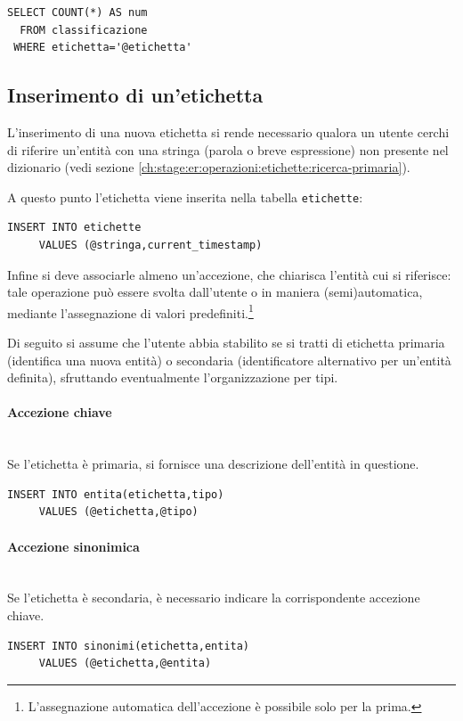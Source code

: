 \documentclass[10pt,a4paper,headinclude,footinclude,hidelinks]{scrreprt} %
\begin{document}
\begin{verbatim}
SELECT COUNT(*) AS num
  FROM classificazione
 WHERE etichetta='@etichetta'
\end{verbatim}

	\subsection{Inserimento di un'etichetta}
	\label{ch:stage:er:operazioni:etichette:inserimento}
	L'inserimento di una nuova etichetta si rende necessario qualora un utente cerchi di riferire un'entità con una stringa (parola o breve espressione) non presente nel dizionario (vedi sezione \ref{ch:stage:er:operazioni:etichette:ricerca-primaria}).

	A questo punto l'etichetta viene inserita nella tabella \texttt{etichette}:
\begin{verbatim}
INSERT INTO etichette
     VALUES (@stringa,current_timestamp)
\end{verbatim}

	Infine si deve associarle almeno un'accezione, che chiarisca l'entità cui si riferisce: tale operazione può essere svolta dall'utente o in maniera (semi)automatica, mediante l'assegnazione di valori predefiniti.\footnote{L'assegnazione automatica dell'accezione è possibile solo per la prima.}

	Di seguito si assume che l'utente abbia stabilito se si tratti di etichetta primaria (identifica una nuova entità) o secondaria (identificatore alternativo per un'entità definita), sfruttando eventualmente l'organizzazione per tipi.

	\paragraph{Accezione chiave} \hfill \\
	Se l'etichetta è primaria, si fornisce una descrizione dell'entità in questione.
\begin{verbatim}
INSERT INTO entita(etichetta,tipo)
     VALUES (@etichetta,@tipo)
\end{verbatim}

	\paragraph{Accezione sinonimica} \hfill \\
	Se l'etichetta è secondaria, è necessario indicare la corrispondente accezione chiave.
\begin{verbatim}
INSERT INTO sinonimi(etichetta,entita)
     VALUES (@etichetta,@entita)
\end{verbatim}
\end{document}
